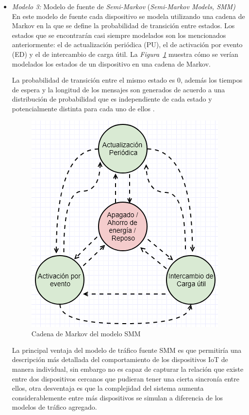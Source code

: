 \begin{itemize}
\item  \textit{Modelo 3:} Modelo de fuente de \textit{Semi-Markov} (\textit{Semi-Markov Models, SMM)}\\

En este modelo de fuente cada dispositivo se modela utilizando una cadena de Markov en la que se define la probabilidad de transición entre estados. Los estados que se encontrarán casi siempre modelados son los mencionados anteriormente: el de actualización periódica (PU), el de activación por evento (ED) y el de intercambio de carga útil. La \textit{Figura~\ref{fig:SMM}} muestra cómo se verían modelados los estados de un dispositivo en una cadena de Markov.\newline

La probabilidad de transición entre el mismo estado es 0, además los tiempos de espera y la longitud de los mensajes son generados de acuerdo a una distribución de probabilidad que es independiente de cada estado y potencialmente distinta para cada uno de ellos \parencite{IoTTrafficHossfeld}.\newline

\begin{figure}[th]
\centering
\includegraphics[scale=1]{Figures/Cadena de Markov del modelo SMM}
\decoRule
\caption[Cadena de Markov del modelo SMM]{Cadena de Markov del modelo SMM}
\label{fig:SMM}
\end{figure}

La principal ventaja del modelo de tráfico fuente SMM es que permitiría una descripción más detallada del comportamiento de los dispositivos IoT de manera individual, sin embargo no es capaz de capturar la relación que existe entre dos dispositivos cercanos que pudieran tener una cierta sincronía entre ellos, otra desventaja es que la complejidad del sistema aumenta considerablemente entre más dispositivos se simulan a diferencia de los modelos de tráfico agregado.\newline


\end{itemize}
